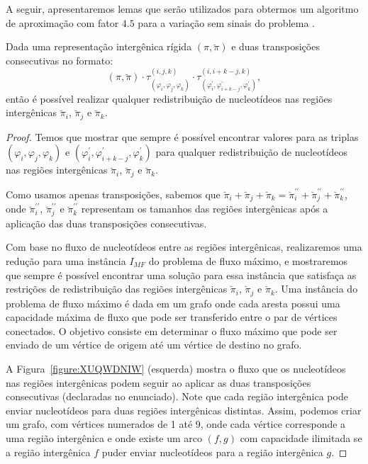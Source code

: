 A seguir, apresentaremos lemas que serão utilizados para obtermos um algoritmo de aproximação com fator $4.5$ para a variação sem sinais do problema \SbIRT{}.

\begin{lemma}\label{lemma:RAJPFOWJ}
Dada uma representação intergênica rígida $(\pi,\breve\pi)$ e duas transposições consecutivas no formato:
$$(\pi,\breve\pi)\cdot\tau^{(i,j,k)}_{(\varphi_i,\varphi_j,\varphi_k)}\cdot\tau^{(i,i+k-j,k)}_{(\varphi^\prime_i,\varphi^\prime_{i+k-j},\varphi^\prime_k)},$$
então é possível realizar qualquer redistribuição de nucleotídeos nas regiões intergênicas $\breve\pi_i$, $\breve\pi_j$ e $\breve\pi_k$.
\end{lemma} 
\begin{proof}
Temos que mostrar que sempre é possível encontrar valores para as triplas $(\varphi_i,\varphi_j,\varphi_k)$ e $(\varphi^\prime_i,\varphi^\prime_{i+k-j},\varphi^\prime_k)$ para qualquer redistribuição de nucleotídeos nas regiões intergênicas $\breve\pi_i$, $\breve\pi_j$ e $\breve\pi_k$.

Como usamos apenas transposições, sabemos que $\breve\pi_i + \breve\pi_j + \breve\pi_k = \breve\pi^{\prime\prime}_i + \breve\pi^{\prime\prime}_j + \breve\pi^{\prime\prime}_k$, onde $\breve\pi^{\prime\prime}_i$, $\breve\pi^{\prime\prime}_j$ e $\breve \pi^{\prime\prime}_k$ representam os tamanhos das regiões intergênicas após a aplicação das duas transposições consecutivas.

Com base no fluxo de nucleotídeos entre as regiões intergênicas, realizaremos uma redução para uma instância $I_{MF}$ do problema de fluxo máximo, e mostraremos que sempre é possível encontrar uma solução para essa instância que satisfaça as restrições de redistribuição das regiões intergênicas $\breve\pi_i$, $\breve\pi_j$ e $\breve\pi_k$. Uma instância do problema de fluxo máximo é dada em um grafo onde cada aresta possui uma capacidade máxima de fluxo que pode ser transferido entre o par de vértices conectados. O objetivo consiste em determinar o fluxo máximo que pode ser enviado de um vértice de origem até um vértice de destino no grafo.

A Figura~\ref{figure:XUQWDNIW} (esquerda) mostra o fluxo que os nucleotídeos nas regiões intergênicas podem seguir ao aplicar as duas transposições consecutivas (declaradas no enunciado). Note que cada região intergênica pode enviar nucleotídeos para duas regiões intergênicas distintas. Assim, podemos criar um grafo, com vértices numerados de 1 até 9, onde cada vértice corresponde a uma região intergênica e onde existe um arco $(f,g)$ com capacidade ilimitada se a região intergênica $f$ puder enviar nucleotídeos para a região intergênica $g$.


\end{proof}
